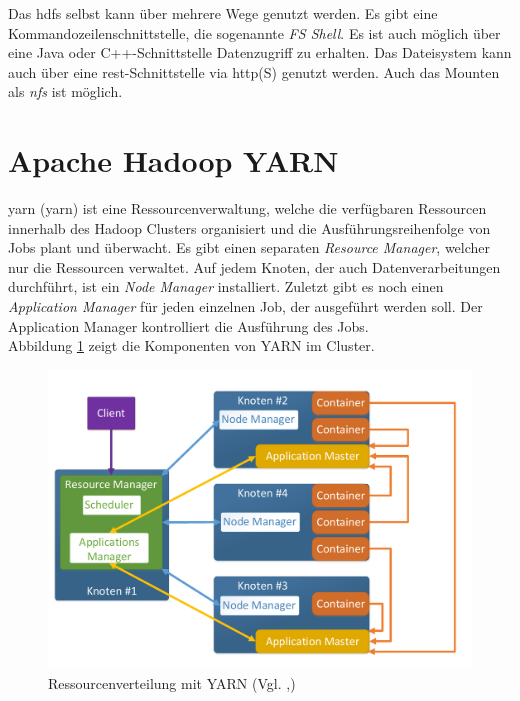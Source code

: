 \noindent
Das \gls{hdfs} selbst kann über mehrere Wege genutzt werden. Es gibt eine Kommandozeilenschnittstelle, die sogenannte \textit{FS Shell}. Es ist auch möglich über eine Java oder C++-Schnittstelle Datenzugriff zu erhalten. Das Dateisystem kann auch über eine \gls{rest}-Schnittstelle via \gls{http}(S) genutzt werden. Auch das Mounten als \textit{\gls{nfs}} ist möglich.

\section{Apache Hadoop YARN}
\label{sec:theory_yarn}
\acrshort{yarn} (\acrlong{yarn}) ist eine Ressourcenverwaltung, welche die verfügbaren Ressourcen innerhalb des Hadoop Clusters organisiert und die Ausführungsreihenfolge von Jobs plant und überwacht. Es gibt einen separaten \textit{Resource Manager}, welcher nur die Ressourcen verwaltet. Auf jedem Knoten, der auch Datenverarbeitungen durchführt, ist ein \textit{Node Manager} installiert. Zuletzt gibt es noch einen \textit{Application Manager} für jeden einzelnen Job, der ausgeführt werden soll. Der Application Manager kontrolliert die Ausführung des Jobs.\\
Abbildung \ref{fig:yarn_cluster_architecture} zeigt die Komponenten von YARN im Cluster.\\

\begin{figure}[ht]
  \centering
  \includegraphics[width=\textwidth]{./resource/yarn_cluster_architecture.pdf}
  \caption{Ressourcenverteilung mit YARN (Vgl. \cite{yarn_architecture},\cite{expert_hadoop_admin})}
  \label{fig:yarn_cluster_architecture}
\end{figure}

